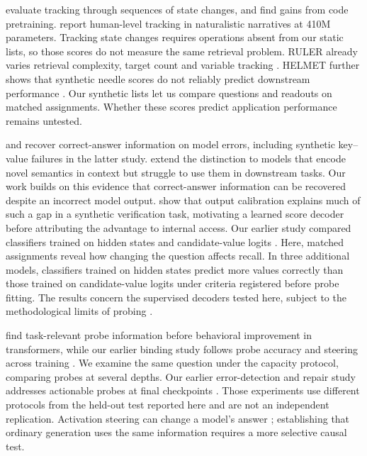 \documentclass{article}
\begin{document}
\citet{kimschuster2023} evaluate tracking through sequences of state changes, and \citet{kim2405} find gains from code pretraining.
\citet{drozdz2026} report human-level tracking in naturalistic narratives at 410M parameters.
Tracking state changes requires operations absent from our static lists, so those scores do not measure the same retrieval problem.
RULER already varies retrieval complexity, target count and variable tracking \citep{ruler2404}.
HELMET further shows that synthetic needle scores do not reliably predict downstream performance \citep{yen2025helmet}.
Our synthetic lists let us compare questions and readouts on matched assignments.
Whether these scores predict application performance remains untested.

\citet{orgad2024} and \citet{karim2026} recover correct-answer information on model errors, including synthetic key--value failures in the latter study.
\citet{lepori2026} extend the distinction to models that encode novel semantics in context but struggle to use them in downstream tasks.
Our work builds on this evidence that correct-answer information can be recovered despite an incorrect model output.
\citet{villuri2026} show that output calibration explains much of such a gap in a synthetic verification task, motivating a learned score decoder before attributing the advantage to internal access.
Our earlier study compared classifiers trained on hidden states and candidate-value logits \citep{decodable2609}.
Here, matched assignments reveal how changing the question affects recall.
In three additional models, classifiers trained on hidden states predict more values correctly than those trained on candidate-value logits under criteria registered before probe fitting.
The results concern the supervised decoders tested here, subject to the methodological limits of probing \citep{hewitt2019,belinkov2022}.

\citet{billa2026} find task-relevant probe information before behavioral improvement in transformers, while our earlier binding study follows probe accuracy and steering across training \citep{decodable2609}.
We examine the same question under the capacity protocol, comparing probes at several depths.
Our earlier error-detection and repair study addresses actionable probes at final checkpoints \citep{legible2609}.
Those experiments use different protocols from the held-out test reported here and are not an independent replication.
Activation steering can change a model's answer \citep{li2023iti,turner2023}; establishing that ordinary generation uses the same information requires a more selective causal test.
\end{document}
